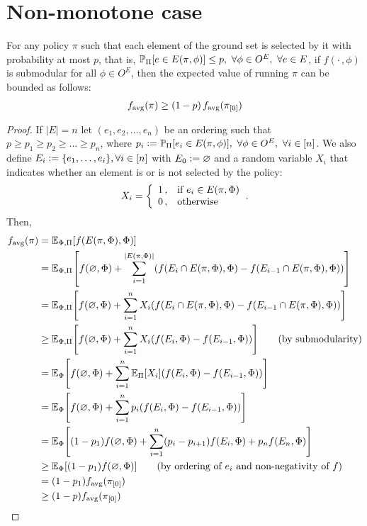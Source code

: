 \section{Non-monotone case}
\begin{lemma}
  For any policy $\pi$ such that each element of the ground set is selected by it with probability at most $p$, that is, $\P[\Pi]{e \in E(\pi, \phi)} \leq p,\ \forall \phi \in O^E,\ \forall e \in E$, if $f(\cdot\,, \phi)$ is submodular for all $\phi \in O^E$, then the expected value of running $\pi$ can be bounded as follows:
\begin{align*}
  f_{\mathrm{avg}}(\pi) \geq (1-p)\,f_{\mathrm{avg}}(\pi_{[0]})
\end{align*}
\end{lemma}
\begin{proof}
  If $|E| = n$ let $(e_1, e_2, \dots, e_n)$ be an ordering such that $p \geq p_1 \geq p_2 \geq \dots \geq p_n$, where $p_i \defeq \P[\Pi]{e_i \in E(\pi, \phi)},\ \forall \phi \in O^E,\ \forall i \in [n]$. We also define $E_i \vcentcolon= \{e_1, \ldots, e_i\}, \forall i \in [n]$ with $E_0 \vcentcolon= \varnothing$ and a random variable $X_i$ that indicates whether an element is or is not selected by the policy:
\begin{align*}
  X_i = \twopartdefo{1}{e_i \in E(\pi, \Phi)}{0}.
\end{align*}
Then,
  \begin{align*}
    \favg(\pi) &= \E[\Phi,\Pi]{f(E(\pi, \Phi), \Phi)}\\
               &= \E[\Phi,\Pi]{f(\varnothing, \Phi) + \sum_{i=1}^{|E(\pi, \Phi)|}\left(f(E_i \cap E(\pi, \Phi), \Phi) - f(E_{i-1} \cap E(\pi, \Phi), \Phi)\right)}\\
               &= \E[\Phi,\Pi]{f(\varnothing, \Phi) + \sum_{i=1}^{n}X_i\left(f(E_i \cap E(\pi, \Phi), \Phi) - f(E_{i-1} \cap E(\pi, \Phi), \Phi)\right)}\\
               &\geq \E[\Phi,\Pi]{f(\varnothing, \Phi) + \sum_{i=1}^{n}X_i\left(f(E_i, \Phi) - f(E_{i-1}, \Phi)\right)} \tag*{(by submodularity)}\\
               &= \E[\Phi]{f(\varnothing, \Phi) + \sum_{i=1}^{n}\E[\Pi]{X_i}\left(f(E_i, \Phi) - f(E_{i-1}, \Phi)\right)}\\
               &= \E[\Phi]{f(\varnothing, \Phi) + \sum_{i=1}^{n}p_i\left(f(E_i, \Phi) - f(E_{i-1}, \Phi)\right)}\\
               &= \E[\Phi]{(1-p_1)f(\varnothing, \Phi) + \sum_{i=1}^{n}(p_i - p_{i+1})f(E_i, \Phi) + p_nf(E_n, \Phi)}\\
               &\geq \E[\Phi]{(1-p_1)f(\varnothing, \Phi)}\tag*{(by ordering of $e_i$ and non-negativity of $f$)}\\
               &= (1-p_1)\favg(\pio)\\
               &\geq (1-p)\favg(\pio)
  \end{align*}
\end{proof}


